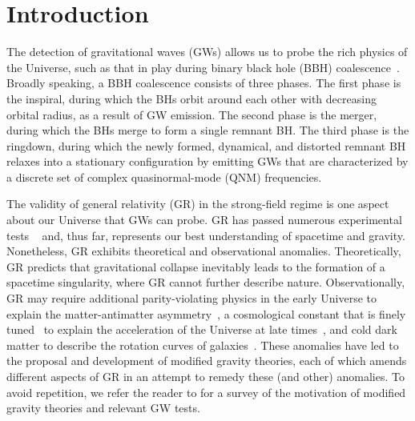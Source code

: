 \documentclass[aps,prx,amsmath,floats,floatfix,twocolumn,
  superscriptaddress,nofootinbib,showpacs]{revtex4-1}
\begin{document}

\section{Introduction}
\label{sec:intro}

The detection of gravitational waves (GWs) allows us to probe the rich physics of the Universe, such as that in play during  
binary black hole (BBH) coalescence~\cite{LIGO_01, LIGO_02, LIGO_03, LIGO_04, LIGO_05, LIGO_06, LIGO_07, LIGO_08, LIGO_09, LIGO_10, LIGO_11, LIGO_GW190412, LIGO_GW190814}. 
Broadly speaking, a BBH coalescence consists of three phases. 
The first phase is the inspiral, during which the BHs orbit around each other with decreasing orbital radius, as a result of GW emission. 
The second phase is the merger, during which the BHs merge to form a single remnant BH. 
The third phase is the ringdown, during which the newly formed, dynamical, and distorted remnant BH relaxes into a stationary configuration by emitting GWs that are characterized by a discrete set of complex quasinormal-mode (QNM) frequencies. 

The validity of general relativity (GR) in the strong-field regime is one aspect about our Universe that GWs can probe. 
GR has passed numerous experimental tests ~\cite{Will2014,Stairs2003,Wex:2020ald,Yunes:2013dva,Will2014,Yagi:2016jml,Berti:2018cxi,Nair:2019iur,Berti:2018vdi, LIGO_07, LIGO_11, LIGOScientific:2021sio, Perkins:2022fhr, Yunes:2013dva} and, thus far, represents our best understanding of spacetime and gravity. 
Nonetheless, GR exhibits theoretical and observational anomalies. 
Theoretically, GR predicts that gravitational collapse inevitably leads to the formation of a spacetime singularity, where GR cannot further describe nature. 
Observationally, GR may require additional parity-violating physics in the early Universe to explain the matter-antimatter asymmetry~\cite{Sakharov:1967dj,Petraki:2013wwa, Gell-Mann:1991kdm, Alexander:2004us}, a cosmological constant that is finely tuned~\cite{Nojiri:2006ri, Tsujikawa:2010zza} to explain the acceleration of the Universe at late times~\cite{late_time_acceleration_01, late_time_acceleration_02}, and cold dark matter to describe the rotation curves of galaxies~\cite{rotation_curve_01, rotation_curve_02}. 
These anomalies have led to the proposal and development of modified gravity theories, each of which amends different aspects of GR in an attempt to remedy these (and other) anomalies. 
To avoid repetition, we refer the reader to \cite{Chung:2023wkd, Chung:2023zdq} for a survey of the motivation of modified gravity theories and relevant GW tests. 
\end{document}
